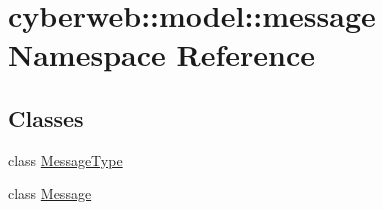 \hypertarget{namespacecyberweb_1_1model_1_1message}{\section{cyberweb\-:\-:model\-:\-:message \-Namespace \-Reference}
\label{namespacecyberweb_1_1model_1_1message}
}
\subsection*{\-Classes}
\begin{DoxyCompactItemize}
\item 
class \hyperlink{classcyberweb_1_1model_1_1message_1_1_message_type}{\-Message\-Type}
\item 
class \hyperlink{classcyberweb_1_1model_1_1message_1_1_message}{\-Message}
\end{DoxyCompactItemize}
